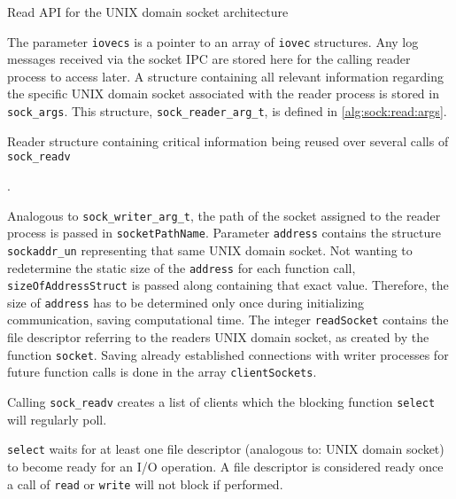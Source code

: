 \begin{algorithm}[h!]
    
    \caption[Socket: Read \ac{API}]{Read \ac{API} for the UNIX domain socket architecture}
    \label{alg:sock:read}
\end{algorithm}

The parameter \texttt{iovecs} is a pointer to an array of \texttt{iovec} structures.
Any log messages received via the socket \ac{IPC} are stored here for the calling reader process to access later.
A structure containing all relevant information regarding the specific UNIX domain socket associated with the reader process is stored in \texttt{sock\_args}.
This structure, \texttt{sock\_reader\_arg\_t}, is defined in \ref{alg:sock:read:args}.

\begin{algorithm}[h!]
    
    \caption[Socket: Reader structure]{Reader structure containing critical information being reused over several calls of \texttt{sock\_readv}}.
    \label{alg:sock:read:args}
\end{algorithm}

Analogous to \texttt{sock\_writer\_arg\_t}, the path of the socket assigned to the reader process is passed in \texttt{socketPathName}.
Parameter \texttt{address} contains the structure \texttt{sockaddr\_un} representing that same UNIX domain socket.
Not wanting to redetermine the static size of the \texttt{address} for each function call, \texttt{sizeOfAddressStruct} is passed along containing that exact value.
Therefore, the size of \texttt{address} has to be determined only once during initializing communication, saving computational time.
The integer \texttt{readSocket} contains the file descriptor referring to the readers UNIX domain socket, as created by the function \texttt{socket}.
Saving already established connections with writer processes for future function calls is done in the array \texttt{clientSockets}.

Calling \texttt{sock\_readv} creates a list of clients which the blocking function \texttt{select} will regularly poll.

\texttt{select} waits for at least one file descriptor (analogous to: UNIX domain socket) to become ready for an I/O operation.
A file descriptor is considered ready once a call of \texttt{read} or \texttt{write} will not block if performed.\cite{man:select}

